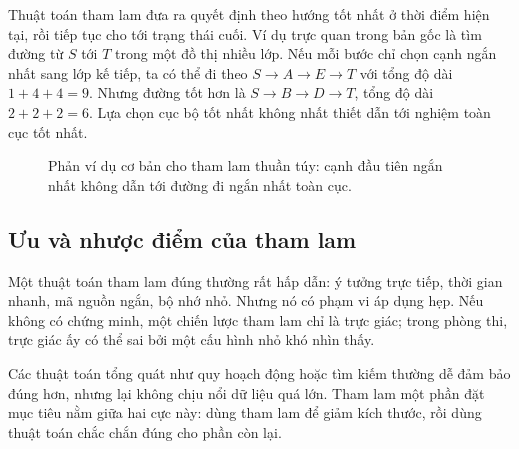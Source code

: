 \documentclass[11pt]{article}
\begin{document}
Thuật toán tham lam đưa ra quyết định theo hướng tốt nhất ở thời điểm hiện
tại, rồi tiếp tục cho tới trạng thái cuối. Ví dụ trực quan trong bản gốc là
tìm đường từ \(S\) tới \(T\) trong một đồ thị nhiều lớp. Nếu mỗi bước chỉ chọn
cạnh ngắn nhất sang lớp kế tiếp, ta có thể đi theo \(S\to A\to E\to T\) với
tổng độ dài \(1+4+4=9\). Nhưng đường tốt hơn là
\(S\to B\to D\to T\), tổng độ dài \(2+2+2=6\). Lựa chọn cục bộ tốt nhất không
nhất thiết dẫn tới nghiệm toàn cục tốt nhất.

\begin{figure}[ht]
\centering
{}
\caption{Phản ví dụ cơ bản cho tham lam thuần túy: cạnh đầu tiên ngắn nhất
không dẫn tới đường đi ngắn nhất toàn cục.}
\end{figure}

\subsection{Ưu và nhược điểm của tham lam}

Một thuật toán tham lam đúng thường rất hấp dẫn: ý tưởng trực tiếp, thời gian
nhanh, mã nguồn ngắn, bộ nhớ nhỏ. Nhưng nó có phạm vi áp dụng hẹp. Nếu không
có chứng minh, một chiến lược tham lam chỉ là trực giác; trong phòng thi, trực
giác ấy có thể sai bởi một cấu hình nhỏ khó nhìn thấy.

Các thuật toán tổng quát như quy hoạch động hoặc tìm kiếm thường dễ đảm bảo
đúng hơn, nhưng lại không chịu nổi dữ liệu quá lớn. Tham lam một phần đặt mục
tiêu nằm giữa hai cực này: dùng tham lam để giảm kích thước, rồi dùng thuật
toán chắc chắn đúng cho phần còn lại.
\end{document}
